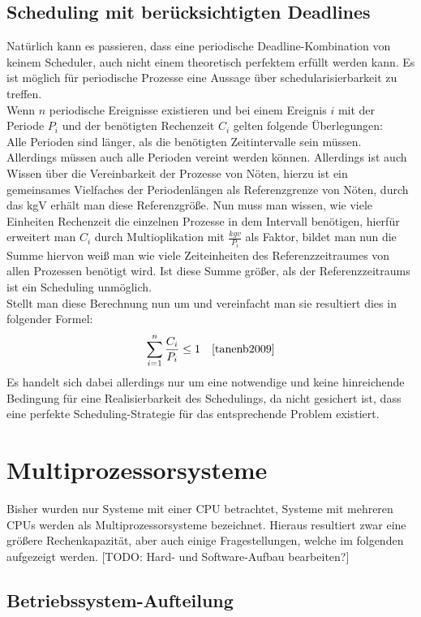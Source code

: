 \subsection{Scheduling mit berücksichtigten Deadlines} 
Natürlich kann es passieren, dass eine periodische Deadline-Kombination von keinem Scheduler, auch nicht einem theoretisch perfektem erfüllt werden kann. Es ist möglich für periodische Prozesse eine Aussage über schedularisierbarkeit zu treffen. \\
Wenn \(n\) periodische Ereignisse existieren und bei einem Ereignis \(i\) mit der Periode \(P_i\) und der benötigten Rechenzeit \(C_i\) gelten folgende Überlegungen: \\
Alle Perioden sind länger, als die benötigten Zeitintervalle sein müssen. Allerdings müssen auch alle Perioden vereint werden können. Allerdings ist auch Wissen über die Vereinbarkeit der Prozesse von Nöten, hierzu ist ein gemeinsames Vielfaches der Periodenlängen als Referenzgrenze von Nöten, durch das kgV erhält man diese Referenzgröße. Nun muss man wissen, wie viele Einheiten Rechenzeit die einzelnen Prozesse in dem Intervall benötigen, hierfür erweitert man \(C_i\) durch Multioplikation mit \(\frac{kgv}{P_i}\) als Faktor, bildet man nun die Summe hiervon weiß man wie viele Zeiteinheiten des Referenzzeitraumes von allen Prozessen benötigt wird. Ist diese Summe größer, als der Referenzzeitraums ist ein Scheduling unmöglich. \\
Stellt man diese Berechnung nun um und vereinfacht man sie resultiert dies in folgender Formel:
\[\sum\limits_{i=1}^{n}\frac{C_i}{P_i} \leq 1 \quad \cite{tanenb2009}\] 
Es handelt sich dabei allerdings nur um eine notwendige und keine hinreichende Bedingung für eine Realisierbarkeit des Schedulings, da nicht gesichert ist, dass eine perfekte Scheduling-Strategie für das entsprechende Problem existiert.
\\

\section{Multiprozessorsysteme}
Bisher wurden nur Systeme mit einer CPU betrachtet, Systeme mit mehreren CPUs werden als Multiprozessorsysteme bezeichnet. Hieraus resultiert zwar eine größere Rechenkapazität, aber auch einige Fragestellungen, welche im folgenden aufgezeigt werden.
[TODO: Hard- und Software-Aufbau bearbeiten?]

\subsection{Betriebssystem-Aufteilung}
